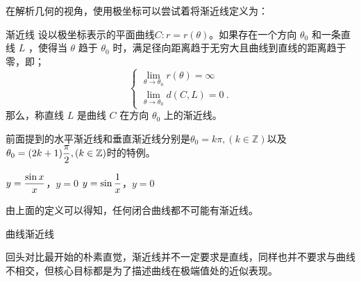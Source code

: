 在解析几何的视角，使用极坐标可以尝试着将渐近线定义为：

\begin{definition}{渐近线}
设以极坐标表示的平面曲线$C:r=r(\theta)$。如果存在一个方向  $\theta_0$  和一条直线  $L$ ，使得当  $\theta$  趋于  $\theta_0$  时，满足径向距离趋于无穷大且曲线到直线的距离趋于零，即；
\begin{equation}
\begin{cases}
\displaystyle\lim_{\theta \to \theta_0} r(\theta) = \infty\\
\displaystyle\lim_{\theta \to \theta_0} d(C, L) = 0~.
\end{cases}
\end{equation}
那么，称直线  $L$  是曲线  $C$  在方向  $\theta_0$  上的渐近线。
\end{definition}

前面提到的水平渐近线和垂直渐近线分别是$\theta_0=k\pi,(k\in\mathbb{Z})$以及$\displaystyle\theta_0=(2k+1){\pi\over2},(k\in\mathbb{Z})$时的特例。


$\displaystyle y={\sin x\over x}$，$y=0$
$\displaystyle y=\sin {1\over x}$，$y=0$

由上面的定义可以得知，任何闭合曲线都不可能有渐近线。

曲线渐近线

回头对比最开始的朴素直觉，渐近线并不一定要求是直线，同样也并不要求与曲线不相交，但核心目标都是为了描述曲线在极端值处的近似表现。